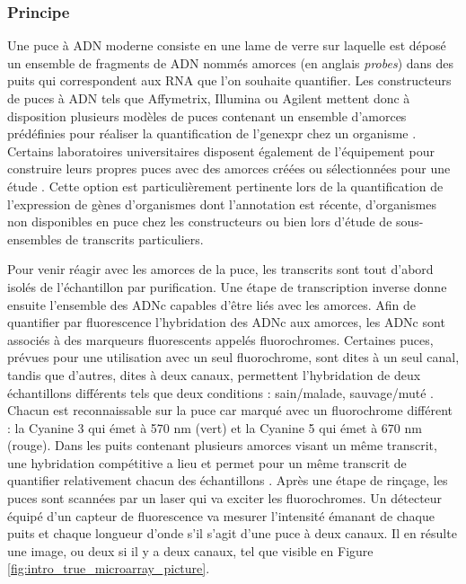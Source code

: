 \subsubsection{Principe}


Une puce à \acrshort{ADN} moderne consiste en une lame de verre sur laquelle est déposé un ensemble de fragments de \acrshort{ADN} nommés amorces (en anglais \textit{probes}) dans des puits qui correspondent aux \acrshort{RNA} que l'on souhaite quantifier. Les constructeurs de puces à \acrshort{ADN} tels que Affymetrix, Illumina ou Agilent mettent donc à disposition plusieurs modèles de puces contenant un ensemble d'amorces prédéfinies pour réaliser la quantification de l'\gls{genexpr} chez un \gls{organisme} \cite{Liu2010}. Certains laboratoires universitaires disposent également de l'équipement pour construire leurs propres puces avec des amorces créées ou sélectionnées pour une étude \cite{Thompson2001Apr}. Cette option est particulièrement pertinente lors de la quantification de l'expression de gènes d'organismes dont l'annotation est récente, d'organismes non disponibles en puce chez les constructeurs ou bien lors d'étude de sous-ensembles de transcrits particuliers.


Pour venir réagir avec les amorces de la puce, les transcrits sont tout d'abord isolés de l'échantillon par purification. Une étape de transcription inverse donne ensuite l'ensemble des ADNc capables d'être liés avec les amorces. Afin de quantifier par fluorescence l'hybridation des ADNc aux amorces, les ADNc sont associés à des marqueurs fluorescents appelés fluorochromes. Certaines puces, prévues pour une utilisation avec un seul fluorochrome, sont dites à un seul canal, tandis que d'autres, dites à deux canaux, permettent l'hybridation de deux échantillons différents tels que deux \glspl{condition} : sain/malade, sauvage/muté \cite{Bumgarner2013Jan}. Chacun est reconnaissable sur la puce car marqué avec un fluorochrome différent : la Cyanine 3 qui émet à  570 nm (vert) et la Cyanine 5 qui émet à 670 nm (rouge). Dans les puits contenant plusieurs amorces visant un même transcrit, une hybridation compétitive a lieu et permet pour un même transcrit de quantifier relativement chacun des échantillons \cite{Koltai2008Apr}. Après une étape de rinçage, les puces sont scannées par un laser qui va exciter les fluorochromes. Un détecteur équipé d'un capteur de fluorescence va mesurer l'intensité émanant de chaque puits et chaque longueur d'onde s'il s'agit d'une puce à deux canaux. Il en résulte une image, ou deux si il y a deux canaux, tel que visible en Figure \ref{fig:intro_true_microarray_picture}.


